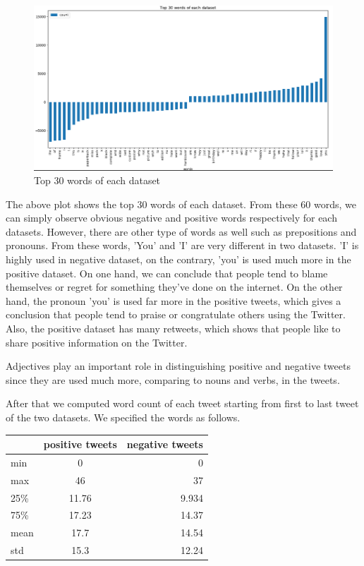 \documentclass[10pt,conference,compsocconf]{IEEEtran}
\begin{document}
\begin{tiny}
	\begin{figure}[b] \label{fig4}
		\includegraphics[scale=0.35]{Lkhamaa2.png}   
		\caption{Top 30 words of each dataset }
		\label{fig4}    
	\end{figure}
\end{tiny}

The above plot shows the top 30 words of each dataset. From these 60 words, we can simply observe obvious negative and positive words respectively for each datasets. However, there are other type of words as well such as prepositions and pronouns. From these words, 'You' and 'I' are very different in two datasets. 'I' is highly used in negative dataset, on the contrary, 'you' is used much more in the positive dataset. On one hand, we can conclude that people tend to blame themselves or regret for something they've done on the internet. On the other hand, the pronoun 'you' is used far more in the positive tweets, which gives a conclusion that people tend to praise or congratulate others using the Twitter. Also, the positive dataset has many retweets, which shows that people like to share positive information on the Twitter.

Adjectives play an important role in distinguishing positive and negative tweets since they are used much more, comparing to nouns and verbs, in the tweets.

After that we computed word count of each tweet starting from first to last tweet of the two datasets. We specified the words as follows.

\begin{center}
	\begin{tabular}{ |l|c|r|}
		\hline
		  & positive tweets & negative tweets \\ \hline
		min & 0 & 0 \\ \hline
		max & 46 & 37 \\ \hline
		25\% & 11.76 & 9.934 \\ \hline
		75\% & 17.23 & 14.37 \\ \hline
		mean & 17.7 & 14.54 \\ \hline
		std & 15.3 & 12.24 \\ \hline
	\end{tabular}
\end{center}
\end{document}
